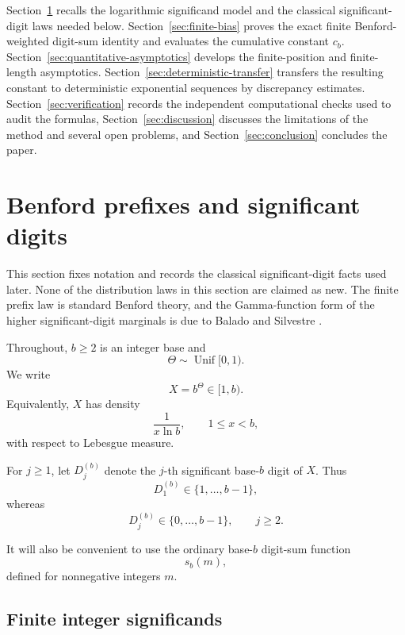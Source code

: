 \documentclass[11pt]{article}
\theoremstyle{definition}
\theoremstyle{remark}
\begin{document}
Section~\ref{sec:benford-preliminaries} recalls the logarithmic
significand model and the classical significant-digit laws needed
below.  Section~\ref{sec:finite-bias} proves the exact finite
Benford-weighted digit-sum identity and evaluates the cumulative
constant \(c_b\).  Section~\ref{sec:quantitative-asymptotics} develops
the finite-position and finite-length asymptotics.
Section~\ref{sec:deterministic-transfer} transfers the resulting
constant to deterministic exponential sequences by discrepancy
estimates. Section~\ref{sec:verification} records the independent computational
checks used to audit the formulas,
Section~\ref{sec:discussion} discusses the limitations of the method
and several open problems, and
Section~\ref{sec:conclusion} concludes the paper.


\section{Benford prefixes and significant digits}
\label{sec:benford-preliminaries}

This section fixes notation and records the classical significant-digit
facts used later.  None of the distribution laws in this section are
claimed as new.  The finite prefix law is standard Benford theory, and
the Gamma-function form of the higher significant-digit marginals is
due to Balado and Silvestre
\cite{BaladoSilvestre2021,BaladoSilvestre2024}.

Throughout, \(b\ge2\) is an integer base and
\[
    \Theta\sim\operatorname{Unif}[0,1).
\]
We write
\[
    X=b^\Theta\in[1,b).
\]
Equivalently, \(X\) has density
\[
    \frac{1}{x\ln b},
    \qquad 1\le x<b,
\]
with respect to Lebesgue measure.

For \(j\ge1\), let \(D_j^{(b)}\) denote the \(j\)-th significant
base-\(b\) digit of \(X\).  Thus
\[
    D_1^{(b)}\in\{1,\ldots,b-1\},
\]
whereas
\[
    D_j^{(b)}\in\{0,\ldots,b-1\},
    \qquad j\ge2.
\]

It will also be convenient to use the ordinary base-\(b\) digit-sum
function
\[
    s_b(m),
\]
defined for nonnegative integers \(m\).

\subsection{Finite integer significands}
\label{subsec:finite-significands}
\end{document}
